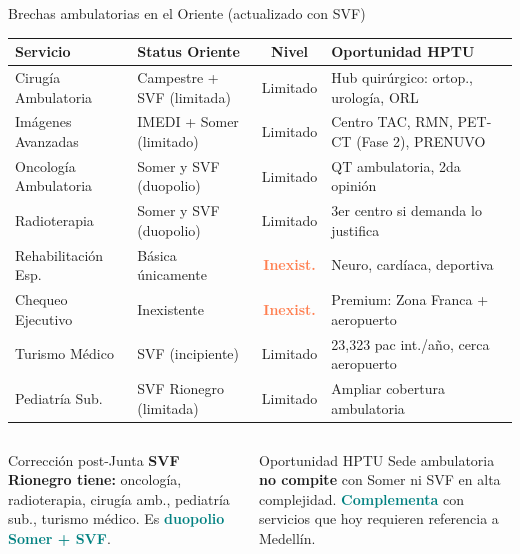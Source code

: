 \documentclass[aspectratio=169, 11pt]{beamer}
\newcommand{\highlight}[1]{\textcolor{teal}{\textbf{#1}}}
\newcommand{\danger}[1]{\textcolor{coral}{\textbf{#1}}}
\newcommand{\src}[1]{\par\vspace{2pt}{\tiny\textcolor{slate}{Fuente: #1}}}
\begin{document}
\begin{frame}{Brechas ambulatorias en el Oriente (actualizado con SVF)}
\vspace{-4pt}
{\scriptsize\setlength{\tabcolsep}{4pt}
\begin{tabular}{@{}p{3.5cm}p{3.5cm}cp{4.5cm}@{}}
\toprule
\textbf{Servicio} & \textbf{Status Oriente} & \textbf{Nivel} & \textbf{Oportunidad HPTU} \\
\midrule
\rowcolor{coral!8}
Cirugía Ambulatoria & Campestre + SVF (limitada) & Limitado & Hub quirúrgico: ortop., urología, ORL \\
Imágenes Avanzadas & IMEDI + Somer (limitado) & Limitado & Centro TAC, RMN, PET-CT (Fase 2), PRENUVO \\
\rowcolor{coral!8}
Oncología Ambulatoria & Somer y SVF (duopolio) & Limitado & QT ambulatoria, 2da opinión \\
Radioterapia & Somer y SVF (duopolio) & Limitado & 3er centro si demanda lo justifica \\
\rowcolor{coral!8}
Rehabilitación Esp. & Básica únicamente & \danger{Inexist.} & Neuro, cardíaca, deportiva \\
Chequeo Ejecutivo & Inexistente & \danger{Inexist.} & Premium: Zona Franca + aeropuerto \\
\rowcolor{coral!8}
Turismo Médico & SVF (incipiente) & Limitado & 23,323 pac int./año, cerca aeropuerto \\
Pediatría Sub. & SVF Rionegro (limitada) & Limitado & Ampliar cobertura ambulatoria \\
\bottomrule
\end{tabular}
}

\vspace{2pt}
\begin{columns}[T]
\begin{exampleblock}{\small Corrección post-Junta}
\scriptsize
\textbf{SVF Rionegro tiene:} oncología, radioterapia, cirugía amb., pediatría sub., turismo médico. Es \highlight{duopolio Somer + SVF}.
\end{exampleblock}
\begin{alertblock}{\small Oportunidad HPTU}
\scriptsize
Sede ambulatoria \textbf{no compite} con Somer ni SVF en alta complejidad. \highlight{Complementa} con servicios que hoy requieren referencia a Medellín.
\end{alertblock}
\end{columns}
\src{REPS (b4dp-ximh), Google Places, Junta Directiva 16 marzo}
\end{frame}
\end{document}
